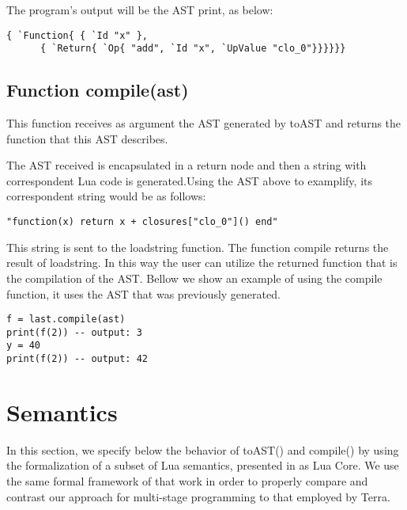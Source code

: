 \documentclass[english]{llncs}
\begin{document}
The program's output will be the AST print, as below:
\begin{verbatim}
{ `Function{ { `Id "x" },
      { `Return{ `Op{ "add", `Id "x", `UpValue "clo_0"}}}}}}
\end{verbatim}


\subsection{Function compile(ast) }


This function receives as argument the AST generated by toAST and returns the function that this AST describes.

The AST received is encapsulated in a return node and then a string with correspondent Lua code is generated.Using the AST above to examplify, its correspondent string would be as follows:


\begin{verbatim}
"function(x) return x + closures["clo_0"]() end"
\end{verbatim}

This string is sent to the loadstring function.
The function compile returns the result of loadstring.
In this way the user can utilize the returned function that is the compilation of the AST.
Bellow we show an example of using the compile function, it uses the AST that was previously generated.


\begin{verbatim}
f = last.compile(ast)
print(f(2)) -- output: 3
y = 40
print(f(2)) -- output: 42
\end{verbatim}



\section{Semantics}

\label{sec:semantics}

In this section, we specify below the behavior of toAST() and compile()
by using the formalization of a subset of Lua semantics, presented
in \cite{DeVito2013Terra} as Lua Core. We use the same formal framework
of that work in order to properly compare and contrast our approach
for multi-stage programming to that employed by Terra.
\end{document}
